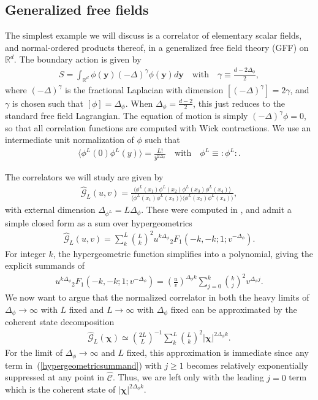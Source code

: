 \documentclass[a4paper,11pt]{article}
\theoremstyle{plain}
\theoremstyle{definition}
\theoremstyle{remark}
\newcommand{\bs}[1]{\boldsymbol{#1}}
\newcommand{\ba}{\begin{equation} \begin{aligned}}
\newcommand{\ea}{\end{aligned} \end{equation}}
\newcommand{\Df}{\Delta_\phi}
\newcommand{\De}{\Delta}
\begin{document}
\subsection{Generalized free fields}
\label{GFF example}
The simplest example we will discuss is a correlator of elementary scalar fields, and normal-ordered products thereof, in a generalized free field theory (GFF) on $\mathbb{R}^d$. The boundary action is given by
\ba
S = \int_{\mathbb{R}^d} \phi(\bs{y}) (-\De)^{\gamma} \phi(\bs{y}) d\bs{y} \quad \text{with} \quad \gamma \equiv \frac{d-2\Df}{2},
\ea
where $(-\De)^{\gamma}$ is the fractional Laplacian with dimension $[(-\De)^\gamma] = 2 \gamma$, and $\gamma$ is chosen such that $[\phi] = \Df$. When $\Df = \frac{d-2}{2}$, this just reduces to the standard free field Lagrangian. The equation of motion is simply $(-\De)^\gamma\phi = 0$, so that all correlation functions are computed with Wick contractions. We use an intermediate unit normalization of $\phi$ such that
\ba
\langle \phi^L(0) \phi^L(y)\rangle = \frac{L!}{y^{2\Df}} \quad \text{with} \quad \phi^L \equiv :\phi^L:.
\ea

The correlators we will study are given by
\ba
\widehat{\mathcal{G}}_L(u,v) = \frac{\langle \phi^L(x_1) \phi^L(x_2) \phi^L(x_3)\phi^L(x_4) \rangle}{\langle \phi^L(x_1) \phi^L(x_2) \rangle \langle \phi^L(x_3) \phi^L(x_4) \rangle},
\ea
with external dimension $\De_{\phi^L} = L\Df $. These were computed in \cite{Poland:2024hvb}, and admit a simple closed form as a sum over hypergeometrics
\ba
\widehat{\mathcal{G}}_L(u,v) = \sum_{k}^L \binom{L}{k}^2 u^{k \Df} {}_2 F_1 ( -k,-k;1;v^{-\Df}).
\ea
For integer $k$, the hypergeometric function simplifies into a polynomial, giving the explicit summands of
\ba
\label{hypergeometricsummand}
u^{k \Df} {}_2 F_1 ( -k,-k;1;v^{-\Df}) = \left( \frac{u}{v}\right)^{\Df k} \sum_{j = 0}^k \binom{k}{j}^2 v^{\Df j}.
\ea
We now want to argue that the normalized correlator in both the heavy limits of $\Df \to \infty$ with $L$ fixed and $L \to \infty$ with $\Df$ fixed can be approximated by the coherent state decomposition 
\ba
\label{cohstateGFF}
\widehat{\mathcal{G}}_L(\bs{\chi}) \simeq  \binom{2L}{L}^{-1}\sum_{k}^L \binom{L}{k}^2 |\bs{\chi}|^{2 \Df k}.
\ea
For the limit of $\Df \to \infty$ and $L$ fixed, this approximation is immediate since any term in~(\ref{hypergeometricsummand}) with $j\geq1$ becomes relatively exponentially suppressed at any point in $\widehat{\mathscr{C}}$. Thus, we are left only with the leading $j=0$ term which is the coherent state of $|\bs{\chi}|^{2\Df k}$. 
\end{document}
